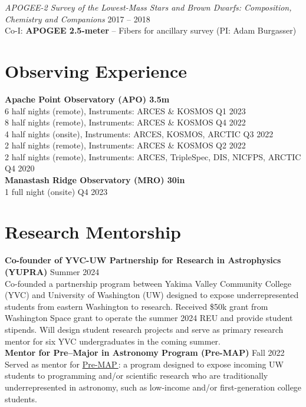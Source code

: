 \documentclass[a4,11pt]{article}
\let\orighref\href
\renewcommand{\href}[2]{\orighref{#1}{#2\,\scriptsize\faExternalLink}}
\begin{document}
\textsl{APOGEE-2 Survey of the Lowest-Mass Stars and Brown Dwarfs: Composition, Chemistry and Companions} \hfill 2017 -- 2018 \\
Co-I: \textbf{APOGEE 2.5-meter} -- Fibers for ancillary survey (PI: Adam Burgasser) 

\section{Observing Experience}
\textbf{Apache Point Observatory (APO) 3.5m}  \\
6 half nights (remote), Instruments: ARCES \& KOSMOS \hfill Q1 2023 \\
8 half nights (remote), Instruments: ARCES \& KOSMOS \hfill Q4 2022 \\
4 half nights (onsite), Instruments: ARCES, KOSMOS, ARCTIC \hfill Q3 2022 \\
2 half nights (remote), Instruments: ARCES \& KOSMOS \hfill Q2 2022 \\
2 half nights (remote), Instruments: ARCES, TripleSpec, DIS, NICFPS, ARCTIC \hfill Q4 2020 \\

\vspace{.2cm}
\textbf{Manastash Ridge Observatory (MRO) 30in} \\
1 full night (onsite) \hfill Q4 2023


\section{Research Mentorship}

\textbf{Co-founder of YVC-UW Partnership for Research in Astrophysics (YUPRA)} \hfill Summer 2024 \\
\vspace{.1cm}
Co-founded a partnership program between Yakima Valley Community College (YVC) and University of Washington (UW) designed to expose underrepresented students from eastern Washington to research. Received \$50k grant from Washington Space grant to operate the summer 2024 REU and provide student stipends. Will design student research projects and serve as primary research mentor for six YVC undergraduates in the coming summer.  \\

\vspace{.3cm}
\textbf{Mentor for Pre–Major in Astronomy Program (Pre-MAP)} \hfill Fall 2022 \\
\vspace{.1cm}
Served as mentor for \href{http://depts.washington.edu/premap/about/}{Pre-MAP}: a program designed to expose incoming UW students to programming and/or scientific research who are traditionally underrepresented in astronomy, such as low-income and/or first-generation college students. \\
\end{document}
